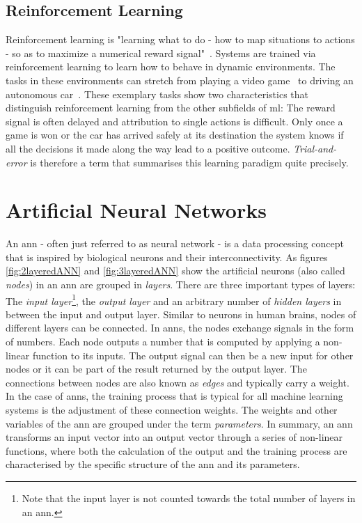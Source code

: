 \documentclass[
			   fontsize=11pt,
               paper=a4,
               bibliography=totoc,
               idxtotoc,
               headsepline,
               footsepline,
               footinclude=false,
               BCOR=12mm,
               DIV=13,
               openany,   %
               ]
               {scrbook}
\begin{document}
\subsection{Reinforcement Learning}

Reinforcement learning is "learning what to do - how to map situations to actions - so as to maximize a numerical reward signal"~\cite{introRL}. Systems are trained via reinforcement learning to learn how to behave in dynamic environments. The tasks in these environments can stretch from playing a video game~\cite{rlStarCraft} to driving an autonomous car~\cite{rlCars}. These exemplary tasks show two characteristics that distinguish reinforcement learning from the other subfields of \gls{ml}: The reward signal is often delayed and attribution to single actions is difficult. Only once a game is won or the car has arrived safely at its destination the system knows if all the decisions it made along the way lead to a positive outcome. \textit{Trial-and-error} is therefore a term that summarises this learning paradigm quite precisely.


\section{Artificial Neural Networks} \label{ssection:ann}

An \acrlong{ann} - often just referred to as neural network - is a data processing concept that is inspired by biological neurons and their interconnectivity. As figures \autoref{fig:2layeredANN} and \autoref{fig:3layeredANN} show the artificial neurons (also called \textit{nodes}) in an \gls{ann} are grouped in \textit{layers}. There are three important types of layers: The \textit{input layer}\footnote{Note that the input layer is not counted towards the total number of layers in an \gls{ann}.}, the \textit{output layer} and an arbitrary number of \textit{hidden layers} in between the input and output layer. Similar to neurons in human brains, nodes of different layers can be connected. In \glspl{ann}, the nodes exchange signals in the form of numbers. Each node outputs a number that is computed by applying a non-linear function to its inputs. The output signal can then be a new input for other nodes or it can be part of the result returned by the output layer. The connections between nodes are also known as \textit{edges} and typically carry a weight. In the case of \glspl{ann}, the training process that is typical for all machine learning systems is the adjustment of these connection weights. The weights and other variables of the \gls{ann} are grouped under the term \textit{parameters}. In summary, an \gls{ann} transforms an input vector into an output vector through a series of non-linear functions, where both the calculation of the output and the training process are characterised by the specific structure of the \gls{ann} and its parameters.
\end{document}
